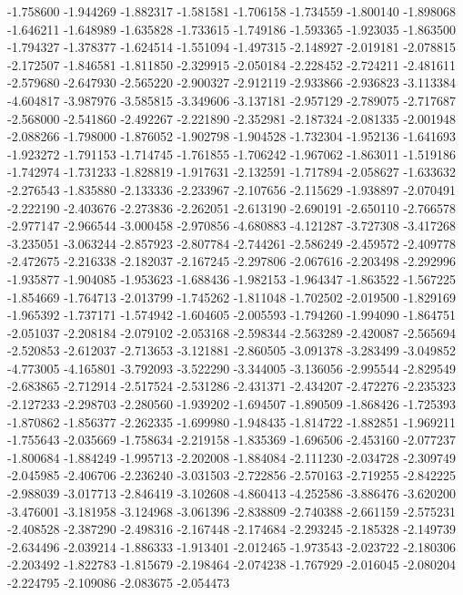 -1.758600
-1.944269
-1.882317
-1.581581
-1.706158
-1.734559
-1.800140
-1.898068
-1.646211
-1.648989
-1.635828
-1.733615
-1.749186
-1.593365
-1.923035
-1.863500
-1.794327
-1.378377
-1.624514
-1.551094
-1.497315
-2.148927
-2.019181
-2.078815
-2.172507
-1.846581
-1.811850
-2.329915
-2.050184
-2.228452
-2.724211
-2.481611
-2.579680
-2.647930
-2.565220
-2.900327
-2.912119
-2.933866
-2.936823
-3.113384
-4.604817
-3.987976
-3.585815
-3.349606
-3.137181
-2.957129
-2.789075
-2.717687
-2.568000
-2.541860
-2.492267
-2.221890
-2.352981
-2.187324
-2.081335
-2.001948
-2.088266
-1.798000
-1.876052
-1.902798
-1.904528
-1.732304
-1.952136
-1.641693
-1.923272
-1.791153
-1.714745
-1.761855
-1.706242
-1.967062
-1.863011
-1.519186
-1.742974
-1.731233
-1.828819
-1.917631
-2.132591
-1.717894
-2.058627
-1.633632
-2.276543
-1.835880
-2.133336
-2.233967
-2.107656
-2.115629
-1.938897
-2.070491
-2.222190
-2.403676
-2.273836
-2.262051
-2.613190
-2.690191
-2.650110
-2.766578
-2.977147
-2.966544
-3.000458
-2.970856
-4.680883
-4.121287
-3.727308
-3.417268
-3.235051
-3.063244
-2.857923
-2.807784
-2.744261
-2.586249
-2.459572
-2.409778
-2.472675
-2.216338
-2.182037
-2.167245
-2.297806
-2.067616
-2.203498
-2.292996
-1.935877
-1.904085
-1.953623
-1.688436
-1.982153
-1.964347
-1.863522
-1.567225
-1.854669
-1.764713
-2.013799
-1.745262
-1.811048
-1.702502
-2.019500
-1.829169
-1.965392
-1.737171
-1.574942
-1.604605
-2.005593
-1.794260
-1.994090
-1.864751
-2.051037
-2.208184
-2.079102
-2.053168
-2.598344
-2.563289
-2.420087
-2.565694
-2.520853
-2.612037
-2.713653
-3.121881
-2.860505
-3.091378
-3.283499
-3.049852
-4.773005
-4.165801
-3.792093
-3.522290
-3.344005
-3.136056
-2.995544
-2.829549
-2.683865
-2.712914
-2.517524
-2.531286
-2.431371
-2.434207
-2.472276
-2.235323
-2.127233
-2.298703
-2.280560
-1.939202
-1.694507
-1.890509
-1.868426
-1.725393
-1.870862
-1.856377
-2.262335
-1.699980
-1.948435
-1.814722
-1.882851
-1.969211
-1.755643
-2.035669
-1.758634
-2.219158
-1.835369
-1.696506
-2.453160
-2.077237
-1.800684
-1.884249
-1.995713
-2.202008
-1.884084
-2.111230
-2.034728
-2.309749
-2.045985
-2.406706
-2.236240
-3.031503
-2.722856
-2.570163
-2.719255
-2.842225
-2.988039
-3.017713
-2.846419
-3.102608
-4.860413
-4.252586
-3.886476
-3.620200
-3.476001
-3.181958
-3.124968
-3.061396
-2.838809
-2.740388
-2.661159
-2.575231
-2.408528
-2.387290
-2.498316
-2.167448
-2.174684
-2.293245
-2.185328
-2.149739
-2.634496
-2.039214
-1.886333
-1.913401
-2.012465
-1.973543
-2.023722
-2.180306
-2.203492
-1.822783
-1.815679
-2.198464
-2.074238
-1.767929
-2.016045
-2.080204
-2.224795
-2.109086
-2.083675
-2.054473
